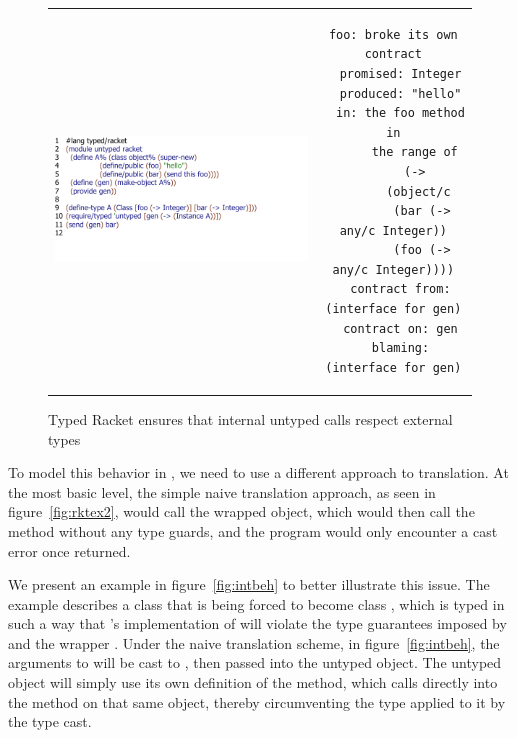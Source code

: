 \documentclass[a4paper,USenglish]{tex/lipics-v2016}
\begin{document}
\begin{figure}
\begin{tabular}{cc}
\includegraphics[scale=.7]{figures/internal.pdf}&\hspace{-2cm}
\begin{minipage}{.5\textwidth}
\vspace{-4.3cm}
\tiny
\begin{lstlisting}[basicstyle=\scriptsize\ttfamily]
foo: broke its own contract
  promised: Integer
  produced: "hello"
  in: the foo method in
      the range of
      (->
       (object/c
        (bar (-> any/c Integer))
        (foo (-> any/c Integer))))
  contract from: (interface for gen)
  contract on: gen
  blaming: (interface for gen)
\end{lstlisting}
\end{minipage}
\end{tabular}
\caption{Typed Racket ensures that internal untyped calls respect external types}
\label{fig:arktex3}
\end{figure}

To model this behavior in \kafka, we need to use a different approach to translation. 
At the most basic level, the simple naive translation approach, as seen in
figure~\ref{fig:rktex2}, would call the wrapped object, which would then call 
the  method without any type guards, and the program would 
only encounter a cast error once  returned.

We present an example in figure~\ref{fig:intbeh} to better illustrate this issue. The example describes a class \C
that is being forced to become class \D, which is typed in such a way that \C's
implementation of \n will violate the type guarantees imposed by \D and the wrapper . 
Under the naive translation scheme, in figure~\ref{fig:intbeh}, the arguments to \m will be cast to \any, 
then passed into the untyped object. The untyped object \C will simply use its own definition
of the \m method, which calls directly into the \n method on that same object,
thereby circumventing the type applied to it by the type cast.
\end{document}
